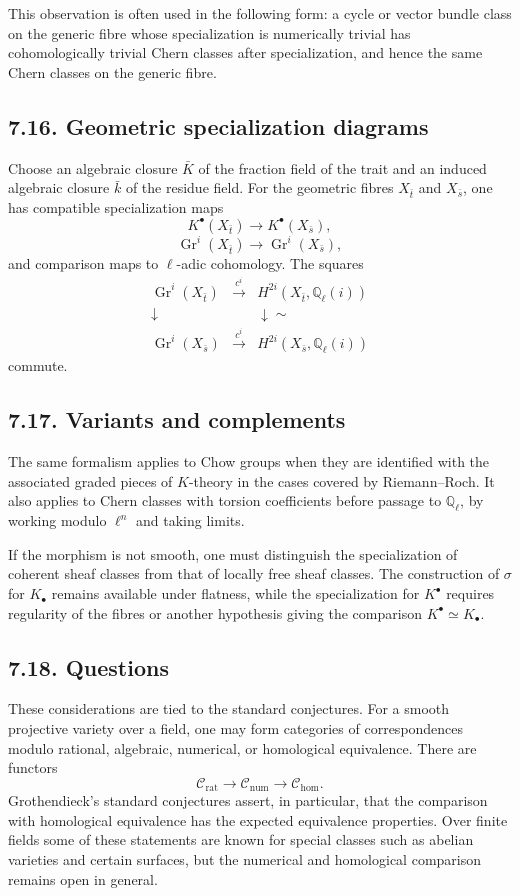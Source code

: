 \documentclass[11pt]{article}
\theoremstyle{plain}
\theoremstyle{definition}
\theoremstyle{remark}
\newcommand{\QQ}{\mathbb Q}
\DeclareMathOperator{\Gr}{Gr}
\newcommand{\longto}{\longrightarrow}
\providecommand{\xto}[1]{\xrightarrow{#1}}
\begin{document}
This observation is often used in the following form: a cycle or vector bundle class on the generic fibre whose specialization is numerically trivial has cohomologically trivial Chern classes after specialization, and hence the same Chern classes on the generic fibre.

\subsection*{7.16. Geometric specialization diagrams}

Choose an algebraic closure $\bar K$ of the fraction field of the trait and an induced algebraic closure $\bar k$ of the residue field. For the geometric fibres $X_{\bar t}$ and $X_{\bar s}$, one has compatible specialization maps
\[
K^\bullet(X_{\bar t})\longto K^\bullet(X_{\bar s}),
\]
\[
\Gr^i(X_{\bar t})\longto \Gr^i(X_{\bar s}),
\]
and comparison maps to $\ell$-adic cohomology. The squares
\[
\begin{array}{ccc}
\Gr^i(X_{\bar t})&\xto{\,c^i\,}&H^{2i}(X_{\bar t},\QQ_\ell(i))\\
\downarrow&&\downarrow\scriptstyle\sim\\
\Gr^i(X_{\bar s})&\xto{\,c^i\,}&H^{2i}(X_{\bar s},\QQ_\ell(i))
\end{array}
\]
commute.

\subsection*{7.17. Variants and complements}

The same formalism applies to Chow groups when they are identified with the associated graded pieces of $K$-theory in the cases covered by Riemann--Roch. It also applies to Chern classes with torsion coefficients before passage to $\QQ_\ell$, by working modulo $\ell^n$ and taking limits.

If the morphism is not smooth, one must distinguish the specialization of coherent sheaf classes from that of locally free sheaf classes. The construction of $\sigma$ for $K_\bullet$ remains available under flatness, while the specialization for $K^\bullet$ requires regularity of the fibres or another hypothesis giving the comparison $K^\bullet\simeq K_\bullet$.

\subsection*{7.18. Questions}

These considerations are tied to the standard conjectures. For a smooth projective variety over a field, one may form categories of correspondences modulo rational, algebraic, numerical, or homological equivalence. There are functors
\[
\mathcal C_{\mathrm{rat}}\longto\mathcal C_{\mathrm{num}}\longto\mathcal C_{\mathrm{hom}}.
\]
Grothendieck's standard conjectures assert, in particular, that the comparison with homological equivalence has the expected equivalence properties. Over finite fields some of these statements are known for special classes such as abelian varieties and certain surfaces, but the numerical and homological comparison remains open in general.
\end{document}
